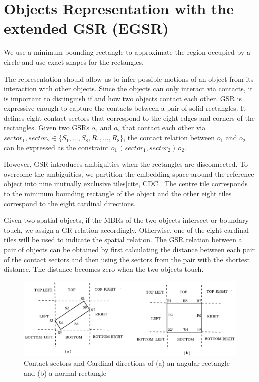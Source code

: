 \documentclass[letterpaper]{article}
\begin{document}
 
\section{Objects Representation with the extended GSR (EGSR)}

We use a minimum bounding rectangle to approximate the region occupied by a circle and use exact shapes for the rectangles.

The representation should allow us to infer possible motions of an object from its interaction with other objects. Since the objects can only interact via contacts, it is important to distinguish if and how two objects contact each other.  GSR is expressive enough to capture the contacts between a pair of solid rectangles. It defines eight contact sectors that correspond to the eight edges and corners of the rectangles. Given two GSRs $o_1$ and $o_2$ that contact each other via $sector_1, sector_2 \in \{S_1, ..., S_8, R_1, ..., R_8\}$, the contact relation between $o_1$ and $o_2$ can be expressed as the constraint $o_1 \, (sector_1, sector_2) \, o_2$. 

However, GSR introduces ambiguities when the rectangles are disconnected. To overcome the ambiguities, we partition the embedding space around the reference object into nine mutually exclusive tiles[cite, CDC]. The centre tile corresponds to the minimum bounding rectangle of the object and the other eight tiles correspond to the eight cardinal directions. 


Given two spatial objects, if the MBRs of the two objects intersect or boundary touch, we assign a GR relation accordingly. Otherwise, one of the eight cardinal tiles will be used to indicate the spatial relation. The GSR relation between a pair of objects can be obtained by first calculating the distance between each pair of the contact sectors and then using the sectors from the pair with the shortest distance. The distance becomes zero when the two objects touch. 

\begin{figure}[h!]
\centering\includegraphics[scale=0.25]{EGSR-relations.png}\caption{Contact sectors and Cardinal directions of (a) an angular rectangle and (b) a normal rectangle}
\end{figure}
\end{document}
